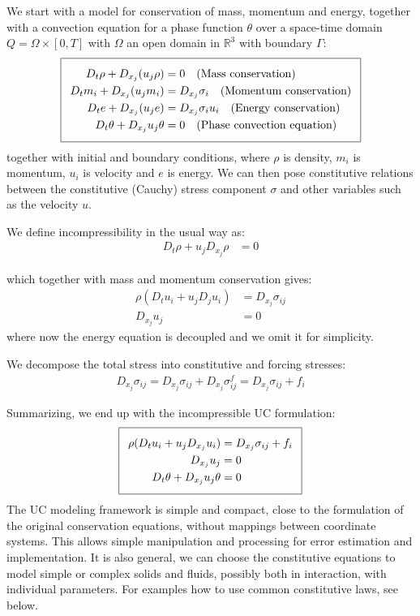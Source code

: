 We start with a model for conservation of mass, momentum and energy,
together with a convection equation for a phase function $\theta$ over
a space-time domain $Q = \Omega \times [0, T]$ with $\Omega$ an open
domain in $\mathbb{R}^3$ with boundary $\Gamma$:
\begin{equation}
  \addtolength{\fboxsep}{5pt}
  \boxed{
    \begin{split}\label{eq:TotalModel}
      D_t \rho + D_{x_j} (u_j \rho) &= 0
      \quad \text{(Mass conservation)}\\
      D_t m_i + D_{x_j} (u_j m_i) &= D_{x_j} \sigma_i
      \quad \text{(Momentum conservation)}\\
      D_t e + D_{x_j} (u_j e) &= D_{x_j} \sigma_i u_i
      \quad \text{(Energy conservation)}\\
      D_t \theta + D_{x_j} u_j \theta &= 0
      \quad \text{(Phase convection equation)}
    \end{split}
  }
\end{equation}
together with initial and boundary conditions, where $\rho$ is
density, $m_i$ is momentum, $u_i$ is velocity and $e$ is energy. We
can then pose constitutive relations between the constitutive (Cauchy)
stress component $\sigma$ and other variables such as the velocity
$u$. 

We define incompressibility in the usual way as:
\begin{align}
D_t \rho + u_j D_{x_j} \rho &= 0
\end{align}

which together with mass and momentum conservation gives:
\begin{align}
\rho(D_t u_i + u_j D_j u_i) &= D_{x_j} \sigma_{ij}\\
D_{x_j} u_j &= 0
\end{align}
where now the energy equation is decoupled and we omit it for simplicity.

We decompose the total stress into constitutive and forcing stresses:
\begin{align}
D_{x_j} \sigma_{ij} = D_{x_j} \sigma_{ij} + D_{x_j} \sigma^f_{ij} =
D_{x_j} \sigma_{ij} + f_i
\end{align}

Summarizing, we end up with the incompressible UC formulation:
\begin{equation}
  \addtolength{\fboxsep}{5pt}
  \boxed{
    \begin{split}\label{eq:TotalUC}
      \rho(D_t u_i + u_j D_{x_j} u_i) &= D_{x_j} \sigma_{ij} + f_i\\
      D_{x_j} u_j &= 0\\
      D_t \theta + D_{x_j} u_j \theta &= 0
    \end{split}
  }
\end{equation}
The UC modeling framework is simple and compact, close to the
formulation of the original conservation equations, without mappings
between coordinate systems. This allows simple manipulation and
processing for error estimation and implementation. It is also
general, we can choose the constitutive equations to model simple or
complex solids and fluids, possibly both in interaction, with
individual parameters. For examples how to use common constitutive
laws, see below.

